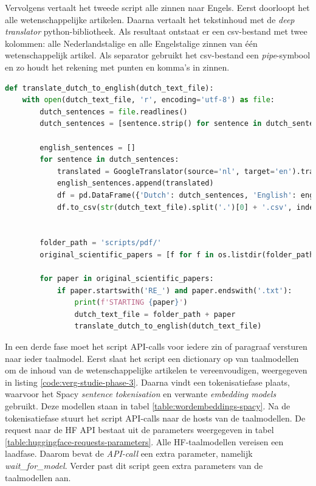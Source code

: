 Vervolgens vertaalt het tweede script alle zinnen naar Engels. Eerst doorloopt het alle wetenschappelijke artikelen. Daarna vertaalt het tekstinhoud met de \textit{deep translator} python-bibliotheek. Als resultaat ontstaat er een csv-bestand met twee kolommen: alle Nederlandstalige en alle Engelstalige zinnen van één wetenschappelijk artikel. Als separator gebruikt het csv-bestand een \textit{pipe}-symbool en zo houdt het rekening met punten en komma's in zinnen.

\begin{center}
	\begin{lstlisting}[language=Python, caption={Script voor de tweede fase van de vergelijkende studie.}, label={code:verg-studie-phase-2}]
def translate_dutch_to_english(dutch_text_file):
	with open(dutch_text_file, 'r', encoding='utf-8') as file:
		dutch_sentences = file.readlines()
		dutch_sentences = [sentence.strip() for sentence in dutch_sentences]
				
		english_sentences = []
		for sentence in dutch_sentences:
			translated = GoogleTranslator(source='nl', target='en').translate(sentence)
			english_sentences.append(translated)
			df = pd.DataFrame({'Dutch': dutch_sentences, 'English': english_sentences})
			df.to_csv(str(dutch_text_file).split('.')[0] + '.csv', index=False)
				
				
		folder_path = 'scripts/pdf/'
		original_scientific_papers = [f for f in os.listdir(folder_path)]
				
		for paper in original_scientific_papers:
			if paper.startswith('RE_') and paper.endswith('.txt'):
				print(f'STARTING {paper}')
				dutch_text_file = folder_path + paper
				translate_dutch_to_english(dutch_text_file)
		\end{lstlisting}
\end{center}

In een derde fase moet het script API-calls voor iedere zin of paragraaf versturen naar ieder taalmodel. Eerst slaat het script een dictionary op van taalmodellen om de inhoud van de wetenschappelijke artikelen te vereenvoudigen, weergegeven in listing \ref{code:verg-studie-phase-3}. Daarna vindt een tokenisatiefase plaats, waarvoor het Spacy \textit{sentence tokenisation} en verwante \textit{embedding models} gebruikt. Deze modellen staan in tabel \ref{table:wordembeddings-spacy}. Na de tokenisatiefase stuurt het script API-calls naar de hosts van de taalmodellen. De request naar de HF API bestaat uit de parameters weergegeven in tabel \ref{table:huggingface-requests-parameters}. Alle HF-taalmodellen vereisen een laadfase. Daarom bevat de \textit{API-call} een extra parameter, namelijk \textit{wait\_for\_model}. Verder past dit script geen extra parameters van de taalmodellen aan. 

